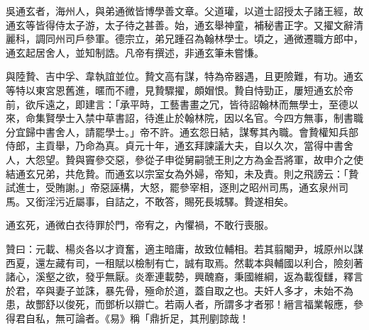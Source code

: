 \begin{pinyinscope}
 吳通玄者，海州人，與弟通微皆博學善文章。父道瓘，以道士詔授太子諸王經，故通玄等皆得侍太子游，太子待之甚善。始，通玄舉神童，補秘書正字。又擢文辭清麗科，調同州司戶參軍。德宗立，弟兄踵召為翰林學士。頃之，通微遷職方郎中，通玄起居舍人，並知制誥。凡帝有撰述，非通玄筆未嘗慊。



 與陸贄、吉中孚、韋執誼並位。贄文高有謀，特為帝器遇，且更險難，有功。通玄等特以東宮恩舊進，暱而不禮，見贄驟擢，頗媢恨。贄自恃勁正，屢短通玄於帝前，欲斥遠之，即建言：「承平時，工藝書畫之冗，皆待詔翰林而無學士，至德以來，命集賢學士入禁中草書詔，待進止於翰林院，因以名官。今四方無事，制書職分宜歸中書舍人，請罷學士。」帝不許。通玄怨日結，謀奪其內職。會贄權知兵部侍郎，主貢舉，乃命為真。貞元十年，通玄拜諫議大夫，自以久次，當得中書舍人，大怨望。贄與竇參交惡，參從子申從舅嗣虢王則之方為金吾將軍，故申介之使結通玄兄弟，共危贄。而通玄以宗室女為外婦，帝知，未及責。則之飛謗云：「贄試進士，受賄謝。」帝惡誣構，大怒，罷參宰相，逐則之昭州司馬，通玄泉州司馬。又銜淫污近屬事，自詰之，不敢答，賜死長城驛。贄遂相矣。



 通玄死，通微白衣待罪於門，帝宥之，內懼禍，不敢行喪服。



 贊曰：元載、楊炎各以才資奮，適主暗庸，故致位輔相。若其翦閹尹，城原州以謀西夏，還左藏有司，一租賦以檢制有亡，誠有取焉。然載本與輔國以利合，險刻著諸心，溪壑之欲，發乎無厭。炎牽連載勢，興醜裔，秉國維綱，返為載復讎，釋言於君，卒與妻子並誅，暴先骨，殛命於道，蓋自取之也。夫奸人多才，未始不為患，故酆舒以俊死，而鄧析以辯亡。若兩人者，所謂多才者邪！縉言福業報應，參得君自私，無可論者。《易》稱「鼎折足，其刑剭諒哉！



\end{pinyinscope}